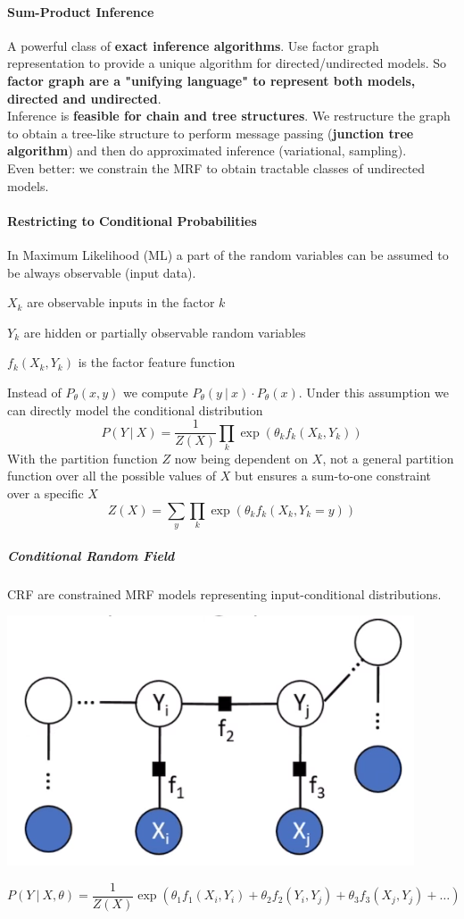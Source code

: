 \documentclass[10pt]{report}
\begin{document}
\paragraph{Sum-Product Inference} A powerful class of \textbf{exact inference algorithms}. Use factor graph representation to provide a unique algorithm for directed/undirected models. So \textbf{factor graph are a "unifying language" to represent both models, directed and undirected}.\\
Inference is \textbf{feasible for chain and tree structures}. We restructure the graph to obtain a tree-like structure to perform message passing (\textbf{junction tree algorithm}) and then do approximated inference (variational, sampling).\\
Even better: we constrain the MRF to obtain tractable classes of undirected models.
\paragraph{Restricting to Conditional Probabilities} In Maximum Likelihood (ML) a part of the random variables can be assumed to be always observable (input data).\begin{list}{}{}
	\item $X_k$ are observable inputs in the factor $k$
	\item $Y_k$ are hidden or partially observable random variables
	\item $f_k(X_k, Y_k)$ is the factor feature function
\end{list}
Instead of $P_\theta(x,y)$ we compute $P_\theta(y\:|\:x)\cdot P_\theta(x)$. Under this assumption we can directly model the conditional distribution $$P(Y\:|\:X) = \frac{1}{Z(X)}\prod_k \exp\left(\theta_kf_k(X_k,Y_k)\right)$$
With the partition function $Z$ now being dependent on $X$, not a general partition function over all the possible values of $X$ but ensures a sum-to-one constraint over a specific $X$
$$Z(X) = \sum_y\prod_k\exp\left(\theta_kf_k(X_k,Y_k = y)\right)$$
\subparagraph{Conditional Random Field} CRF are constrained MRF models representing input-conditional distributions.
\begin{center}
	\includegraphics[scale=0.5]{35.png}
\end{center}
$$P(Y\:|\:X,\theta) = \frac{1}{Z(X)}\exp\left(\theta_1f_1(X_i, Y_i) + \theta_2f_2(Y_i,Y_j) + \theta_3f_3(X_j, Y_j)+\ldots\right)$$
\end{document}
